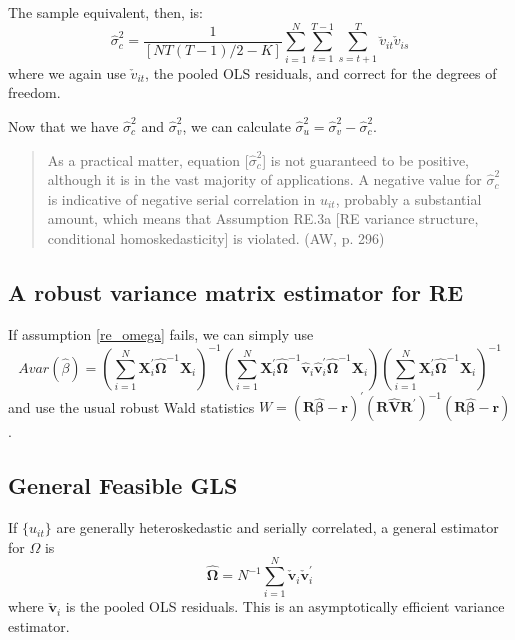 \documentclass[11pt, a4paper]{report}
\theoremstyle{plain}
\theoremstyle{plain}
\theoremstyle{remark}
\begin{document}
The sample equivalent, then, is:
\begin{equation}
    \hat{\sigma}_{c}^{2}=\frac{1}{[N T(T-1) / 2-K]} \sum_{i=1}^{N} \sum_{t=1}^{T-1} \sum_{s=t+1}^{T} \breve{v}_{i t} \check{v}_{i s}
    \end{equation}
where we again use $ \check{v}_{i t}$, the pooled OLS residuals, and correct for the degrees of freedom. 

Now that we have $\hat{\sigma}_{c}^{2}$ and $\hat{\sigma}_{v}^{2}$, we can calculate $\hat{\sigma}_{u}^{2} = \hat{\sigma}_{v}^{2} - \hat{\sigma}_{c}^{2}$.

\begin{quote}
    As a practical matter, equation [$\hat{\sigma}_{c}^{2}$] is not guaranteed to be positive, although
it is in the vast majority of applications. A negative value for $\hat{\sigma}_{c}^{2}$ is indicative of negative serial correlation in $u_{it}$, probably a substantial amount, which means that Assumption RE.3a [RE variance structure, conditional homoskedasticity] is violated. (AW, p. 296)
\end{quote}

\subsection{A robust variance matrix estimator for RE}

If assumption \ref{re_omega} fails, we can simply use
\begin{equation}
    Avar(\hat{\beta})=\left(\sum_{i=1}^{N} \mathbf{X}_{i}^{\prime} \hat{\mathbf{\Omega}}^{-1} \mathbf{X}_{i}\right)^{-1}\left(\sum_{i=1}^{N} \mathbf{X}_{i}^{\prime} \hat{\mathbf{\Omega}}^{-1} \hat{\mathbf{v}}_{i} \hat{\mathbf{v}}_{i}^{\prime} \hat{\mathbf{\Omega}}^{-1} \mathbf{X}_{i}\right)\left(\sum_{i=1}^{N} \mathbf{X}_{i}^{\prime} \hat{\mathbf{\Omega}}^{-1} \mathbf{X}_{i}\right)^{-1}
    \end{equation}
and use the usual robust Wald statistics $W = (\mathbf{R} \hat{\boldsymbol{\beta}}-\mathbf{r})^{\prime}\left(\mathbf{R} \hat{\mathbf{V}} \mathbf{R}^{\prime}\right)^{-1}(\mathbf{R} \hat{\boldsymbol{\beta}}-\mathbf{r})$.

\subsection{General Feasible GLS}

If $\{u_{it}\}$ are generally heteroskedastic and serially correlated, a general estimator for $\Omega$ is
\begin{equation}
    \hat{\boldsymbol{\Omega}}=N^{-1} \sum_{i=1}^{N} \check{\mathbf{v}}_{i} \check{\mathbf{v}}_{i}^{\prime}
    \end{equation}
where $\check{\mathbf{v}}_{i}$ is the pooled OLS residuals. This is an asymptotically efficient variance estimator. 
\end{document}
